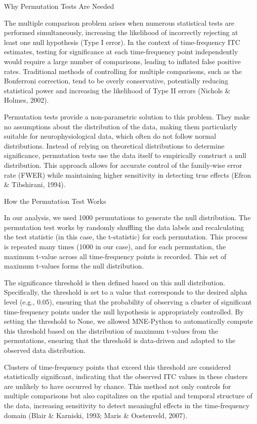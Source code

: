 \documentclass[
  letterpaper,
  DIV=11,
  numbers=noendperiod]{scrartcl}
\begin{document}
Why Permutation Tests Are Needed

The multiple comparison problem arises when numerous statistical tests
are performed simultaneously, increasing the likelihood of incorrectly
rejecting at least one null hypothesis (Type I error). In the context of
time-frequency ITC estimates, testing for significance at each
time-frequency point independently would require a large number of
comparisons, leading to inflated false positive rates. Traditional
methods of controlling for multiple comparisons, such as the Bonferroni
correction, tend to be overly conservative, potentially reducing
statistical power and increasing the likelihood of Type II errors
(Nichols \& Holmes, 2002).

Permutation tests provide a non-parametric solution to this problem.
They make no assumptions about the distribution of the data, making them
particularly suitable for neurophysiological data, which often do not
follow normal distributions. Instead of relying on theoretical
distributions to determine significance, permutation tests use the data
itself to empirically construct a null distribution. This approach
allows for accurate control of the family-wise error rate (FWER) while
maintaining higher sensitivity in detecting true effects (Efron \&
Tibshirani, 1994).

How the Permutation Test Works

In our analysis, we used 1000 permutations to generate the null
distribution. The permutation test works by randomly shuffling the data
labels and recalculating the test statistic (in this case, the
t-statistic) for each permutation. This process is repeated many times
(1000 in our case), and for each permutation, the maximum t-value across
all time-frequency points is recorded. This set of maximum t-values
forms the null distribution.

The significance threshold is then defined based on this null
distribution. Specifically, the threshold is set to a value that
corresponds to the desired alpha level (e.g., 0.05), ensuring that the
probability of observing a cluster of significant time-frequency points
under the null hypothesis is appropriately controlled. By setting the
threshold to None, we allowed MNE-Python to automatically compute this
threshold based on the distribution of maximum t-values from the
permutations, ensuring that the threshold is data-driven and adapted to
the observed data distribution.

Clusters of time-frequency points that exceed this threshold are
considered statistically significant, indicating that the observed ITC
values in these clusters are unlikely to have occurred by chance. This
method not only controls for multiple comparisons but also capitalizes
on the spatial and temporal structure of the data, increasing
sensitivity to detect meaningful effects in the time-frequency domain
(Blair \& Karniski, 1993; Maris \& Oostenveld, 2007).
\end{document}

